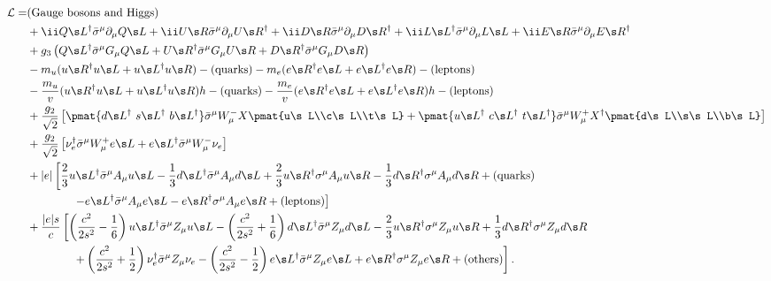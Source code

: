 \begin{align}
 \Lag =
& \text{(Gauge bosons and Higgs)}\notag\\
&
+ \ii Q\s L^\dagger\bar\sigma^\mu\partial_\mu Q\s L
+ \ii U\s R        \bar\sigma^\mu\partial_\mu U\s R^\dagger
+ \ii D\s R        \bar\sigma^\mu\partial_\mu D\s R^\dagger
+ \ii L\s L^\dagger\bar\sigma^\mu\partial_\mu L\s L
+ \ii E\s R        \bar\sigma^\mu\partial_\mu E\s R^\dagger \notag\\
&
+ g_3\left(
 Q\s L^\dagger\bar\sigma^\mu G_\mu Q\s L
+U\s R^\dagger\bar\sigma^\mu G_\mu U\s R
+D\s R^\dagger\bar\sigma^\mu G_\mu D\s R
\right)\notag\\
&
-m_u(u\s R^\dagger u\s L+u\s L^\dagger u\s R)-\text{(quarks)}
-m_e(e\s R^\dagger e\s L+e\s L^\dagger e\s R)-\text{(leptons)}
\notag\\&
-\frac{m_u}v(u\s R^\dagger u\s L+u\s L^\dagger u\s R)h - \text{(quarks)}
-\frac{m_e}v(e\s R^\dagger e\s L+e\s L^\dagger e\s R)h - \text{(leptons)}
\notag\\
&+
\frac{g_2}{\sqrt2}\left[
\pmat{d\s L^\dagger\ s\s L^\dagger\ b\s L^\dagger}
\bar\sigma^\mu W^-_\mu X \pmat{u\s L\\c\s L\\t\s L}
+
\pmat{u\s L^\dagger\ c\s L^\dagger\ t\s L^\dagger}
\bar\sigma^\mu W^+_\mu X^\dagger \pmat{d\s L\\s\s L\\b\s L}
\right]
\notag\\&
+\frac{g_2}{\sqrt2}\left[
\nu_e^\dagger\bar\sigma^\mu W^+_\mu e\s L + e\s L^\dagger\bar\sigma^\mu W^-_\mu \nu_e
\right]\notag\\
&
+|e|\left[
  \frac23 u\s L^\dagger \bar\sigma^\mu A_\mu u\s L
- \frac13 d\s L^\dagger \bar\sigma^\mu A_\mu d\s L
+ \frac23 u\s R^\dagger     \sigma^\mu A_\mu u\s R
- \frac13 d\s R^\dagger     \sigma^\mu A_\mu d\s R
+ \text{(quarks)}
\right.\notag\\&\left.\qquad\qquad
- e\s L^\dagger \bar\sigma^\mu A_\mu e\s L
- e\s R^\dagger     \sigma^\mu A_\mu e\s R
+ \text{(leptons)}\right]\notag\\
&%
+\frac{|e|s}{c}\left[
  \left(\frac{c^2}{2s^2}-\frac16\right)u\s L^\dagger \bar\sigma^\mu Z_\mu u\s L
- \left(\frac{c^2}{2s^2}+\frac16\right)d\s L^\dagger \bar\sigma^\mu Z_\mu d\s L
- \frac23 u\s R^\dagger     \sigma^\mu Z_\mu u\s R
+ \frac13 d\s R^\dagger     \sigma^\mu Z_\mu d\s R
\right.\notag\\&\left.\qquad\qquad
+ \left(\frac{c^2}{2s^2}+\frac12\right)\nu_e^\dagger \bar\sigma^\mu Z_\mu \nu_e
- \left(\frac{c^2}{2s^2}-\frac12\right)e\s L^\dagger \bar\sigma^\mu Z_\mu e\s L
+ e\s R^\dagger     \sigma^\mu Z_\mu e\s R
+ \text{(others)}\right].
\end{align}


